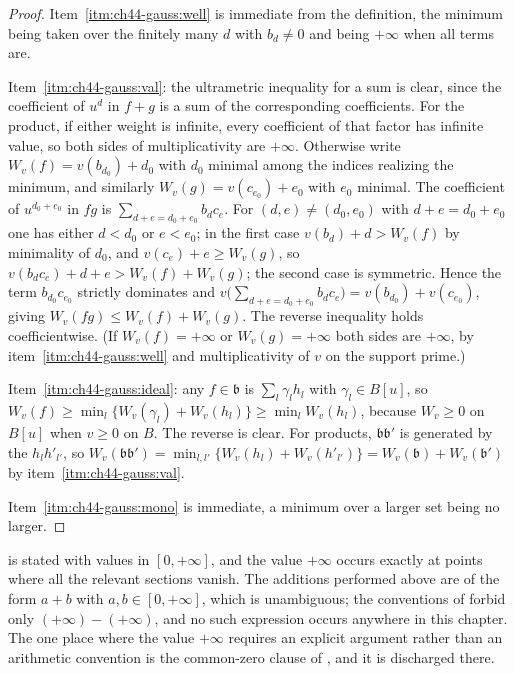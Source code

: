 \begin{proof}
Item~\cref{itm:ch44-gauss:well} is immediate from the definition, the minimum
being taken over the finitely many $d$ with $b_d\neq0$ and being
$+\infty$ when all terms are.

Item~\cref{itm:ch44-gauss:val}: the ultrametric inequality for a sum is clear,
since the coefficient of $u^d$ in $f+g$ is a sum of the corresponding
coefficients.  For the product, if either weight is infinite, every coefficient of
that factor has infinite value, so both sides of multiplicativity are
$+\infty$.  Otherwise write $W_v(f)=v(b_{d_0})+d_0$ with $d_0$
minimal among the indices realizing the minimum, and similarly
$W_v(g)=v(c_{e_0})+e_0$ with $e_0$ minimal.  The coefficient of
$u^{d_0+e_0}$ in $fg$ is $\sum_{d+e=d_0+e_0}b_dc_e$.  For
$(d,e)\ne(d_0,e_0)$ with $d+e=d_0+e_0$ one has either $d<d_0$ or
$e<e_0$; in the first case $v(b_d)+d>W_v(f)$ by minimality of $d_0$,
and $v(c_e)+e\ge W_v(g)$, so $v(b_dc_e)+d+e>W_v(f)+W_v(g)$; the second
case is symmetric.  Hence the term $b_{d_0}c_{e_0}$ strictly dominates and
$v\bigl(\sum_{d+e=d_0+e_0}b_dc_e\bigr)=v(b_{d_0})+v(c_{e_0})$, giving
$W_v(fg)\le W_v(f)+W_v(g)$.  The reverse inequality holds coefficientwise.
(If $W_v(f)=+\infty$ or $W_v(g)=+\infty$ both sides are $+\infty$, by
item~\cref{itm:ch44-gauss:well} and multiplicativity of $v$ on the support
prime.)

Item~\cref{itm:ch44-gauss:ideal}: any $f\in\mathfrak b$ is
$\sum_l\gamma_lh_l$ with $\gamma_l\in B[u]$, so
$W_v(f)\ge\min_l\{W_v(\gamma_l)+W_v(h_l)\}\ge\min_lW_v(h_l)$, because
$W_v\ge0$ on $B[u]$ when $v\ge0$ on $B$.  The reverse is clear.  For
products, $\mathfrak b\mathfrak b'$ is generated by the $h_lh'_{l'}$, so
$W_v(\mathfrak b\mathfrak b')=\min_{l,l'}\{W_v(h_l)+W_v(h'_{l'})\}
=W_v(\mathfrak b)+W_v(\mathfrak b')$ by
item~\cref{itm:ch44-gauss:val}.

Item~\cref{itm:ch44-gauss:mono} is immediate, a minimum over a larger set
being no larger.
\end{proof}

\begin{remark}
\label{rem:ch44-gauss-infinity}
 is stated with values in
$[0,+\infty]$, and the value $+\infty$ occurs exactly at points where
all the relevant sections vanish.  The additions performed above are of the
form $a+b$ with $a,b\in[0,+\infty]$, which is unambiguous; the
conventions of  forbid only
$(+\infty)-(+\infty)$, and no such expression occurs anywhere in this
chapter.  The one place where the value $+\infty$ requires an explicit
argument rather than an arithmetic convention is the common-zero clause of
, and it is discharged there.
\end{remark}

